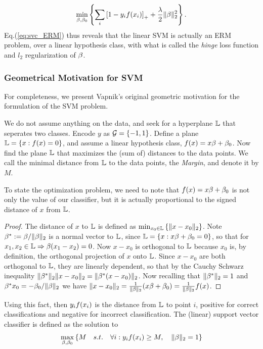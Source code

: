 \begin{align}
\label{eq:svc_ERM}
	\min_{\beta,\beta_0} \left\{ 
		\sum_i \left[ 1-y_i f(x_i) \right]_+ +\frac{\lambda}{2} \Vert \beta \Vert_2^2
	 \right\}.
\end{align}
Eq.(\ref{eq:svc_ERM}) thus reveals that the linear SVM is actually an ERM problem, over a linear hypothesis class, with what is called the \emph{hinge} loss function and $l_2$ regularization of $\beta$.


\subsubsection{Geometrical Motivation for SVM}
For completeness, we present Vapnik's original geometric motivation \citep{vapnik_statistical_1998} for the formulation of the SVM problem. 

We do not assume anything on the data, and seek for a hyperplane $\mathbb{L}$ that seperates two classes. 
Encode $y$ as $\mathcal{G}=\left\{ -1,1 \right\}$.
Define a plane $\mathbb{L}=\left\{ x: f(x)=0  \right\}$, and assume a linear hypothesis class, $f(x)=x\beta+\beta_0$.
Now find the plane $\mathbb{L}$ that maximizes the (sum of) distances to the data points.
We call the minimal distance from $\mathbb{L}$ to the data points, the \emph{Margin}, and denote it by $M$.

To state the optimization problem, we need to note that $f(x)=x\beta+\beta_0$ is not only the value of our classifier, but it is actually proportional to the signed distance of $x$ from $\mathbb{L}$. 
\begin{proof}
The distance of $x$ to $\mathbb{L}$ is defined as $\min_{x_0 \in \mathbb{L}} \left\{  \Vert x-x_0 \Vert_2  \right\}$.
Note $\beta^*:=\beta/\Vert \beta \Vert_2$ is a normal vector to $\mathbb{L}$, since $\mathbb{L}=\left\{ x: x\beta+\beta_0=0  \right\}$, so that for $x_1,x_2 \in \mathbb{L} \Rightarrow \beta(x_1-x_2)=0$.
Now $x-x_0$ is orthogonal to $\mathbb{L}$ because $x_0$ is, by definition, the orthogonal projection of $x$ onto $\mathbb{L}$.
Since $x-x_0$ are both orthogonal to $\mathbb{L}$, they are linearly dependent, so that by the Cauchy Schwarz inequality $\Vert \beta^* \Vert_2 \Vert x-x_0 \Vert_2= \Vert \beta^*(x-x_0) \Vert_2$.
Now recalling that $\Vert \beta^* \Vert_2=1$ and $\beta^* x_0=-\beta_0/\Vert \beta \Vert_2$ we have $\Vert x-x_0 \Vert_2=\frac{1}{\Vert \beta \Vert_2} (x\beta+\beta_0)= \frac{1}{\Vert \beta \Vert_2} f(x)$.
\end{proof}

Using this fact, then $y_i f(x_i)$ is the distance from $\mathbb{L}$ to point $i$, positive for correct classifications and negative for incorrect classification. 
The (linear) support vector classifier is defined as the solution to
\begin{align}
\label{eq:svc_separable}
	\max_{\beta,\beta_0} \left\{  
		M \quad s.t. \quad 
		\forall i: y_i f(x_i) \geq M, \quad \Vert \beta \Vert_2=1
	 \right\}
\end{align}

